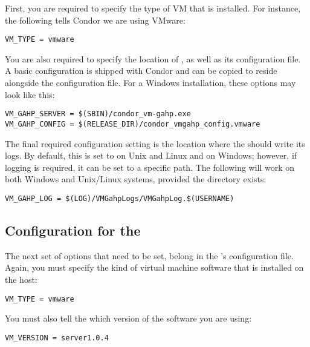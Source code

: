 First, you are required to specify the type of VM that is installed. 
For instance, the following tells Condor we are using VMware:

\begin{verbatim}
VM_TYPE = vmware
\end{verbatim}

You are also required to specify the location of , as well as 
its configuration file. A basic  configuration is shipped 
with Condor and can be copied to reside alongside the configuration file. For a 
Windows installation, these options may look like this:

\begin{verbatim}
VM_GAHP_SERVER = $(SBIN)/condor_vm-gahp.exe
VM_GAHP_CONFIG = $(RELEASE_DIR)/condor_vmgahp_config.vmware
\end{verbatim}

The final required configuration setting is the location where the
 should write its logs. By default, this is set to 
 on Unix and Linux and  on Windows; however, if 
logging is required, it can be set to a specific path.  The following will 
work on both Windows and Unix/Linux systems, provided the 
 directory exists:

\begin{verbatim}
VM_GAHP_LOG = $(LOG)/VMGahpLogs/VMGahpLog.$(USERNAME)
\end{verbatim}

\subsection{Configuration for the }

The next set of options that need to be set, belong in the 's 
configuration file.  Again, you must specify the kind of virtual machine 
software that is installed on the host:

\begin{verbatim}
VM_TYPE = vmware
\end{verbatim}

You must also tell the  which version of the software you 
are using:

\begin{verbatim}
VM_VERSION = server1.0.4
\end{verbatim}


